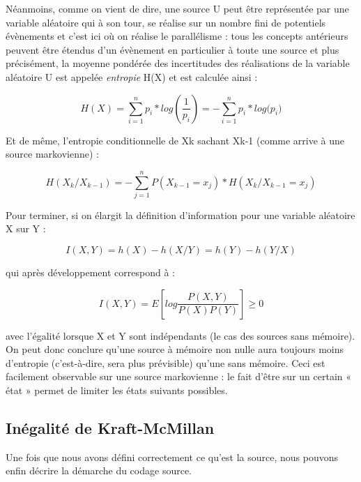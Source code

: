 \documentclass[a4paper,12pt,french]{article}
\begin{document}
    Néanmoins, comme on vient de dire, une source U peut être représentée par une variable aléatoire qui à son tour, se réalise sur un nombre fini de potentiels évènements et c’est ici où on réalise le parallélisme : tous les concepts antérieurs peuvent être étendus d’un évènement en particulier à toute une source et plus précisément, la moyenne pondérée des incertitudes des réalisations de la variable aléatoire U est appelée \textit{entropie} H(X) et est calculée ainsi :

    \begin{equation}
    H(X) = \sum_{i=1}^{n} p_{i} * log (\frac{1}{p_{i}}) = - \sum_{i=1}^{n} {p_{i} * log (p_{i}}) 
    \end{equation}

    Et de même, l’entropie conditionnelle de Xk sachant Xk-1 (comme arrive à une source markovienne) :
    
    \begin{equation}
    H(X_{k}/X_{k-1}) = - \sum_{j=1}^{n} P(X_{k-1} = x_{j}) * H(X_{k}/X_{k-1} = x_{j}) 
    \end{equation}

    Pour terminer, si on élargit la définition d’information pour une variable aléatoire X sur Y :
    
    \begin{equation}
    I (X,Y) = h(X) - h(X/Y) = h(Y) - h(Y/X)
    \end{equation}
    
    qui après développement correspond à :
    
    \begin{equation}
    I(X,Y) = E  \left[log \frac{P(X,Y)}{P(X)P(Y)}  \right] \geq 0
    \end{equation}
    
    avec l’égalité lorsque X et Y sont indépendants (le cas des sources sans mémoire). On peut donc conclure qu’une source à mémoire non nulle aura toujours moins d’entropie (c’est-à-dire, sera plus prévisible) qu’une sans mémoire. Ceci est facilement observable sur une source markovienne : le fait d’être sur un certain « état » permet de limiter les états suivants possibles.

	\subsection{Inégalité de Kraft-McMillan}
	
	Une fois que nous avons défini correctement ce qu’est la source, nous pouvons enfin décrire la démarche du codage source. 
    
\end{document}
